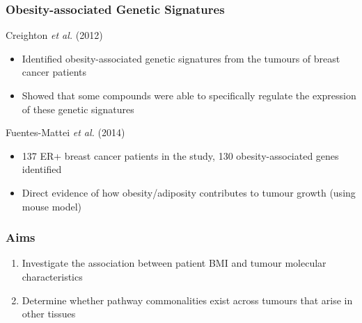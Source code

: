 \documentclass[handout]{beamer}
\begin{document}
\begin{frame}
	\frametitle{Obesity-associated Genetic Signatures}
	Creighton \textit{et al.} (2012)
	\begin{itemize}
		\item Identified obesity-associated genetic signatures from the tumours of breast cancer patients
		\item Showed that some compounds were able to specifically regulate the expression of these genetic signatures
	\end{itemize}
	Fuentes-Mattei \textit{et al.} (2014)
		\begin{itemize}
			\item 137 ER+ breast cancer patients in the study, 130 obesity-associated genes identified
			\item Direct evidence of how obesity/adiposity contributes to tumour growth (using mouse model)
		\end{itemize}
\end{frame}

\begin{frame}
	\frametitle{Aims}
	\begin{enumerate}
		\item Investigate the association between patient BMI and tumour molecular characteristics
		\item Determine whether pathway commonalities exist across tumours that arise in other tissues
	\end{enumerate}
\end{frame}

\end{document}
